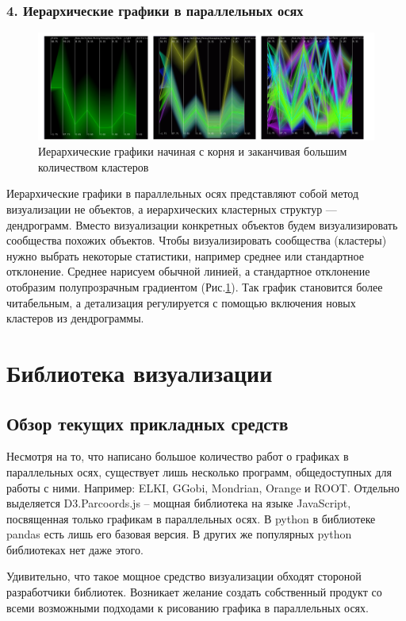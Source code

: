 \documentclass[12pt,fleqn]{article}
\begin{document}
\subsubsection{4. Иерархические графики в параллельных осях}
\begin{figure}[htb]
    \centering
    \includegraphics[width=14cm]{hierarchical.png}
    \caption{Иерархические графики начиная с корня и заканчивая большим количеством кластеров}
    \label{hierarchical_coords}
\end{figure}
Иерархические графики в параллельных осях представляют собой метод визуализации не объектов, а иерархических
кластерных структур --- дендрограмм. Вместо визуализации конкретных объектов будем
визуализировать сообщества похожих объектов. Чтобы визуализировать сообщества (кластеры)
нужно выбрать некоторые статистики, например среднее или стандартное отклонение. Среднее нарисуем обычной линией, а 
стандартное отклонение отобразим полупрозрачным градиентом (Рис.\ref{hierarchical_coords}).
Так график становится более читабельным, а детализация регулируется с
помощью включения новых кластеров из дендрограммы.\cite{hierarchical}

\section{Библиотека визуализации}
\subsection{Обзор текущих прикладных средств}
Несмотря на то, что написано большое количество работ о графиках в параллельных осях, 
существует лишь несколько программ, общедоступных для работы с ними.
Например: ELKI, GGobi, Mondrian, Orange и ROOT. Отдельно выделяется D3.Parcoords.js -- 
мощная библиотека на языке JavaScript, посвященная только графикам в параллельных осях.
В python в библиотеке pandas есть лишь его базовая версия. В других же популярных
python библиотеках нет даже этого.

Удивительно, что такое мощное средство визуализации обходят стороной разработчики библиотек. 
Возникает желание создать собственный продукт со всеми возможными подходами к рисованию графика 
в параллельных осях.
\end{document}
